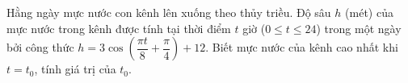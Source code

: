 \begin{bt}%
	Hằng ngày mực nước con kênh lên xuống theo thủy triều. Độ sâu $ h$ (mét) của mực nước trong kênh được tính tại thời điểm $t$ giờ ($0\le t\le24$) trong một ngày bởi công thức $ h=3\cos\left(\dfrac{\pi t}{8}+\dfrac{\pi}{4}\right)+12$. Biết mực nước của kênh cao nhất khi $t=t_0$, tính giá trị của $t_0$.
\end{bt}
